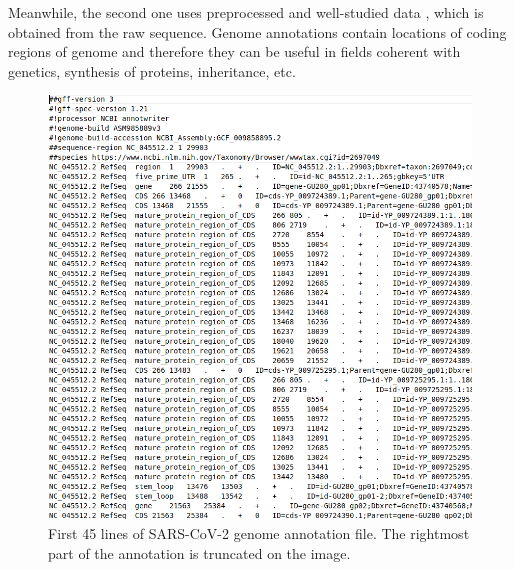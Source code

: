 Meanwhile, the second one uses preprocessed and well-studied data \cite{gff}, which is obtained from the raw sequence. 
Genome annotations contain locations of coding regions of genome and therefore they can be useful in fields coherent with genetics, synthesis of proteins, inheritance, etc.
\begin{figure}[!ht]
	\centering
	\includegraphics[width=.8\textwidth]{figures/gff3.png}
	\caption{First 45 lines of SARS-CoV-2 genome annotation file. The rightmost part of the annotation is truncated on the image.\label{o:latex_friendly_zone}}
\end{figure}

